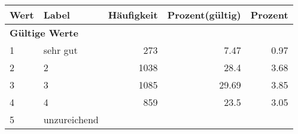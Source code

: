      \begin{longtable}{lXrrr}
     \toprule
     \textbf{Wert} & \textbf{Label} & \textbf{Häufigkeit} & \textbf{Prozent(gültig)} & \textbf{Prozent} \\
     \endhead
     \midrule
     \multicolumn{5}{l}{\textbf{Gültige Werte}}\\

     1 &
     \multicolumn{1}{X}{ sehr gut   } &


       \num{273} &
       \num[round-mode=places,round-precision=2]{7.47} &
         \num[round-mode=places,round-precision=2]{0.97} \\

     2 &
     \multicolumn{1}{X}{ 2   } &


       \num{1038} &
       \num[round-mode=places,round-precision=2]{28.4} &
         \num[round-mode=places,round-precision=2]{3.68} \\

     3 &
     \multicolumn{1}{X}{ 3   } &


       \num{1085} &
       \num[round-mode=places,round-precision=2]{29.69} &
         \num[round-mode=places,round-precision=2]{3.85} \\

     4 &
     \multicolumn{1}{X}{ 4   } &


       \num{859} &
       \num[round-mode=places,round-precision=2]{23.5} &
         \num[round-mode=places,round-precision=2]{3.05} \\

     5 &
     \multicolumn{1}{X}{ unzureichend   } &



\end{longtable}
